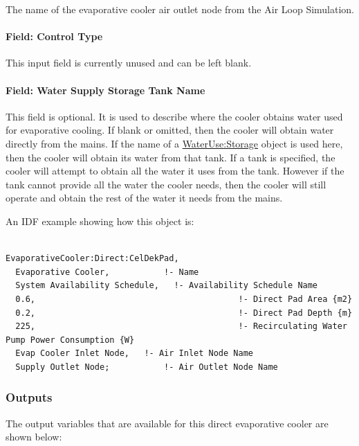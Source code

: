 The name of the evaporative cooler air outlet node from the Air Loop Simulation.

\paragraph{Field: Control Type}\label{field-control-type-001}

This input field is currently unused and can be left blank.

\paragraph{Field: Water Supply Storage Tank Name}\label{field-water-supply-storage-tank-name-000}

This field is optional. It is used to describe where the cooler obtains water used for evaporative cooling. If blank or omitted, then the cooler will obtain water directly from the mains. If the name of a \hyperref[waterusestorage]{WaterUse:Storage} object is used here, then the cooler will obtain its water from that tank. If a tank is specified, the cooler will attempt to obtain all the water it uses from the tank. However if the tank cannot provide all the water the cooler needs, then the cooler will still operate and obtain the rest of the water it needs from the mains.

An IDF example showing how this object is:

\begin{lstlisting}

EvaporativeCooler:Direct:CelDekPad,
  Evaporative Cooler,           !- Name
  System Availability Schedule,   !- Availability Schedule Name
  0.6,                                         !- Direct Pad Area {m2}
  0.2,                                         !- Direct Pad Depth {m}
  225,                                         !- Recirculating Water Pump Power Consumption {W}
  Evap Cooler Inlet Node,   !- Air Inlet Node Name
  Supply Outlet Node;           !- Air Outlet Node Name
\end{lstlisting}

\subsubsection{Outputs}

The output variables that are available for this direct evaporative cooler are shown below:


